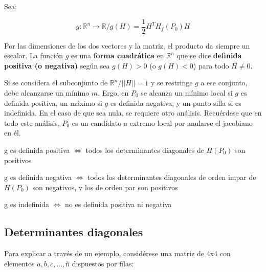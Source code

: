 \documentclass{article}
\renewcommand{\Bbb}{\mathbb}
\begin{document}
Sea:

\begin{equation}
g:\Bbb R^n \rightarrow \Bbb R / g(H) = \frac{1}{2} H^T H_f(P_0) H
\end{equation}

Por las dimensiones de los dos vectores y la matriz, el producto da siempre un escalar. La función $g$ es una \textbf{forma cuadrática} en $\Bbb R^n$ que se dice \textbf{definida positiva (o negativa)} según sea $g(H) > 0$ (o $g(H) < 0$) para todo $H \neq 0$.  

Si se considera el subconjunto de $\Bbb R^n / ||H|| = 1$ y se restringe $g$ a ese conjunto, debe alcanzarse un mínimo $m$. Ergo, en $P_0$ se alcanza un mínimo local si $g$ es definida positiva, un máximo si $g$ es definida negativa, y un punto silla si es indefinida. En el caso de que sea nula, se requiere otro análisis. Recuérdese que en todo este análisis, $P_0$ es un candidato a extremo local por anularse el jacobiano en él.

g es definida positiva $\Leftrightarrow$ todos los determinantes diagonales de $H(P_0)$ son positivos

g es definida negativa $\Leftrightarrow$ todos los determinantes diagonales de orden impar de $H(P_0)$ son negativos, y los de orden par son positivos

g es indefinida $\Leftrightarrow$ no es definida positiva ni negativa

\subsection{Determinantes diagonales}

Para explicar a través de un ejemplo, considérese una matriz de 4x4 con elementos $a, b, c, \ldots , $ñ dispuestos por filas:
\end{document}
